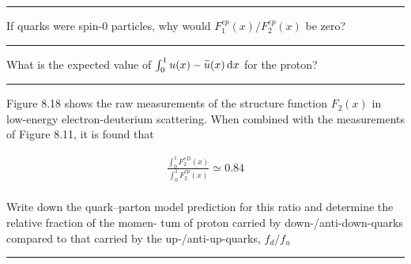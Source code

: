 \noindent\rule{7in}{1.5pt}


\begin{problem}{8.4}
    If quarks were spin-0 particles, why would $F^{ep}_1(x)/F^{ep}_2(x)$ be zero?
\end{problem}
\begin{solution}

\end{solution}

\noindent\rule{7in}{1.5pt}


\begin{problem}{8.5}
    What is the expected value of $\int_0^1 u(x) - \overbar{u}(x) \dif x$ for the proton?
\end{problem}
\begin{solution}

\end{solution}

\noindent\rule{7in}{1.5pt}


\begin{problem}{8.6}
Figure 8.18 shows the raw measurements of the structure function $F_2(x)$ in low-energy electron-deuterium scattering. When combined with the measurements of Figure 8.11, it is found that

\begin{align*}
    \frac{\int_0^1 F^{eD}_2(x)}{\int_0^1 F^{ep}_2(x)} \simeq 0.84
\end{align*}\\
Write down the quark–parton model prediction for this ratio and determine the relative fraction of the momen- tum of proton carried by down-/anti-down-quarks compared to that carried by the up-/anti-up-quarks, $f_d/f_u$
\end{problem}
\begin{solution}

\end{solution}

\noindent\rule{7in}{1.5pt}


